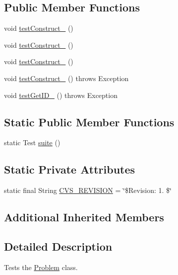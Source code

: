 \subsection*{Public Member Functions}
\begin{DoxyCompactItemize}
\item 
void \hyperlink{classorg_1_1jgap_1_1distr_1_1_problem_test_a52ed569cd07b86a740db2984b7190db7}{test\-Construct\-\_} ()
\item 
void \hyperlink{classorg_1_1jgap_1_1distr_1_1_problem_test_abd7a0a15fe80ea225b73a7ea912c5170}{test\-Construct\-\_} ()
\item 
void \hyperlink{classorg_1_1jgap_1_1distr_1_1_problem_test_aa5e95660aea6a3e05ad1433c50c254e7}{test\-Construct\-\_} ()
\item 
void \hyperlink{classorg_1_1jgap_1_1distr_1_1_problem_test_a9c12a06d9de2ba83f01392444b6ba8d7}{test\-Construct\-\_} ()  throws Exception 
\item 
void \hyperlink{classorg_1_1jgap_1_1distr_1_1_problem_test_a418f28bb6981b171c820c4f7e3acb3e2}{test\-Get\-I\-D\-\_} ()  throws Exception 
\end{DoxyCompactItemize}
\subsection*{Static Public Member Functions}
\begin{DoxyCompactItemize}
\item 
static Test \hyperlink{classorg_1_1jgap_1_1distr_1_1_problem_test_a5fd2a46a53c29668c2ef6b17df0b40d5}{suite} ()
\end{DoxyCompactItemize}
\subsection*{Static Private Attributes}
\begin{DoxyCompactItemize}
\item 
static final String \hyperlink{classorg_1_1jgap_1_1distr_1_1_problem_test_a1cef738828cf20f53b8dea78ee9e6a89}{C\-V\-S\-\_\-\-R\-E\-V\-I\-S\-I\-O\-N} = \char`\"{}\$Revision\-: 1. \$\char`\"{}
\end{DoxyCompactItemize}
\subsection*{Additional Inherited Members}


\subsection{Detailed Description}
Tests the \hyperlink{classorg_1_1jgap_1_1distr_1_1_problem}{Problem} class.

